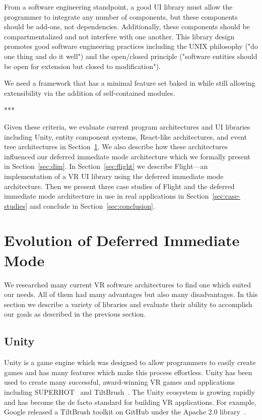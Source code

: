 \documentclass[conference,12pt]{IEEEtran}
\begin{document}
From a software engineering standpoint, a good UI library must allow the
programmer to integrate any number of components, but these components should
be add-ons, not dependencies. Additionally, these components should be
compartmentalized and not interfere with one another. This library design
promotes good software engineering practices including the UNIX philosophy ("do
one thing and do it well") and the open/closed principle ("software entities
should be open for extension but closed to modification").

We need a framework that has a minimal feature set baked in while still allowing
extensibility via the addition of self-contained modules.

\begin{center}***\end{center}

Given these criteria, we evaluate current program architectures and UI libraries
including Unity, entity component systems, React-like architectures, and event
tree architectures in Section~\ref{sec:evolution}. We also describe how these
architectures influenced our deferred immediate mode architecture which we
formally present in Section~\ref{sec:dim}. In Section~\ref{sec:flight} we
describe Flight---an implementation of a VR UI library using the deferred
immediate mode architecture. Then we present three case studies of Flight and
the deferred immediate mode architecture in use in real applications in
Section~\ref{sec:case-studies} and conclude in Section~\ref{sec:conclusion}.

\section{Evolution of Deferred Immediate Mode}\label{sec:evolution}
We researched many current VR software architectures to find one which suited
our needs. All of them had many advantages but also many disadvantages. In this
section we describe a variety of libraries and evaluate their ability to
accomplish our goals as described in the previous section.

\subsection{Unity}\label{sec:unity}
Unity is a game engine which was designed to allow programmers to easily create
games and has many features which make this process effortless. Unity has been
used to create many successful, award-winning VR games and applications
including SUPERHOT~\cite{UploadVR:SUPERHOT} and
TiltBrush~\cite{Unity:TiltBrush}. The Unity ecosystem is growing rapidly and has
become the de facto standard for building VR applications. For example, Google
released a TiltBrush toolkit on GitHub under the Apache 2.0
library~\cite{Google:TiltBrush}.
\end{document}
